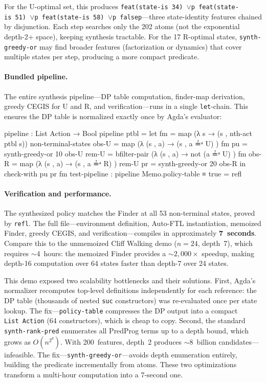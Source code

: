 \noindent For the U-optimal set, this produces \texttt{feat(state-is~34)~$\vee$p~feat(state-is~51)~$\vee$p~feat(state-is~58)~$\vee$p~falsep}---three state-identity features chained by disjunction.  Each step searches only the 202 atoms (not the exponential depth-2+ space), keeping synthesis tractable.  For the 17 R-optimal states, \texttt{synth-greedy-or} may find broader features (factorization or dynamics) that cover multiple states per step, producing a more compact predicate.

\paragraph{Bundled pipeline.}
The entire synthesis pipeline---DP table computation, finder-map derivation, greedy CEGIS for U and R, and verification---runs in a single \texttt{let}-chain.  This ensures the DP table is normalized exactly once by Agda's evaluator:

\begin{spec}
pipeline : List Action → Bool
pipeline ptbl =
  let fm    = map (λ s → (s , nth-act ptbl s)) non-terminal-states
      obs-U = map (λ { (s , a) → (s , a ≟ᵃ U) }) fm
      pu    = synth-greedy-or 10 obs-U
      rem-U = bfilter-pair (λ { (s , a) → not (a ≟ᵃ U) }) fm
      obs-R = map (λ { (s , a) → (s , a ≟ᵃ R) }) rem-U
      pr    = synth-greedy-or 20 obs-R
  in check-with pu pr fm
test-pipeline : pipeline Memo.policy-table ≡ true    = refl
\end{spec}

\paragraph{Verification and performance.}
The synthesized policy matches the Finder at all 53 non-terminal states, proved by \texttt{refl}.  The full file---environment definition, Auto-FTL instantiation, memoized Finder, greedy CEGIS, and verification---compiles in approximately \textbf{7~seconds}.  Compare this to the unmemoized Cliff Walking demo ($n = 24$, depth~7), which requires $\sim$4~hours: the memoized Finder provides a ${\sim}2{,}000\times$ speedup, making depth-16 computation over 64 states faster than depth-7 over 24 states.

\begin{remark}
This demo exposed two scalability bottlenecks and their solutions.  First, Agda's normalizer recomputes top-level definitions independently for each reference: the DP table (thousands of nested \texttt{suc} constructors) was re-evaluated once per state lookup.  The fix---\texttt{policy-table} compresses the DP output into a compact \texttt{List~Action} (64 constructors), which is cheap to copy.  Second, the standard \texttt{synth-rank-pred} enumerates all PredProg terms up to a depth bound, which grows as $O(n^{2^d})$.  With 200~features, depth~2 produces $\sim$8~billion candidates---infeasible.  The fix---\texttt{synth-greedy-or}---avoids depth enumeration entirely, building the predicate incrementally from atoms.  These two optimizations transform a multi-hour computation into a 7-second one.
\end{remark}


